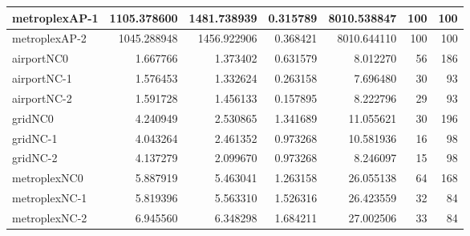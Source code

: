 \begin{longtable}{|l|r|r|r|r|r|r|}
metroplexAP-1 & 1105.378600 & 1481.738939 & 0.315789 & 8010.538847 & 100 & 100 \\ \hline
metroplexAP-2 & 1045.288948 & 1456.922906 & 0.368421 & 8010.644110 & 100 & 100 \\ \hline
airportNC0 & 1.667766 & 1.373402 & 0.631579 & 8.012270 & 56 & 186 \\ \hline
airportNC-1 & 1.576453 & 1.332624 & 0.263158 & 7.696480 & 30 & 93 \\ \hline
airportNC-2 & 1.591728 & 1.456133 & 0.157895 & 8.222796 & 29 & 93 \\ \hline
gridNC0 & 4.240949 & 2.530865 & 1.341689 & 11.055621 & 30 & 196 \\ \hline
gridNC-1 & 4.043264 & 2.461352 & 0.973268 & 10.581936 & 16 & 98 \\ \hline
gridNC-2 & 4.137279 & 2.099670 & 0.973268 & 8.246097 & 15 & 98 \\ \hline
metroplexNC0 & 5.887919 & 5.463041 & 1.263158 & 26.055138 & 64 & 168 \\ \hline
metroplexNC-1 & 5.819396 & 5.563310 & 1.526316 & 26.423559 & 32 & 84 \\ \hline
metroplexNC-2 & 6.945560 & 6.348298 & 1.684211 & 27.002506 & 33 & 84 \\ \hline
\end{longtable}
